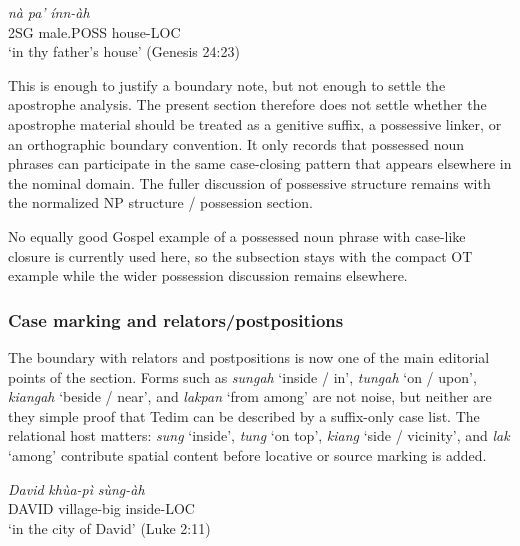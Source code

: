 \documentclass[
  11pt,
  a4paper,
]{article}
\newcommand{\tdim}[1]{\textit{#1}}
\newcommand{\tdimword}[1]{\textit{#1}}
\renewcommand{\textsc}[1]{{\footnotesize\MakeUppercase{#1}}}
\newcommand{\glossquote}[1]{`#1'}
\begin{document}
\begin{exe}
\ex \label{ex:case-poss-na-pa-inn}
\gll \tdimword{nà} \tdimword{pa'} \tdimword{ínn-àh} \\
     \textsc{2sg} male.\textsc{poss} house-\textsc{loc} \\
\glt \glossquote{in thy father's house} (Genesis 24:23)
\end{exe}

This is enough to justify a boundary note, but not enough to settle the
apostrophe analysis. The present section therefore does not settle
whether the apostrophe material should be treated as a genitive suffix,
a possessive linker, or an orthographic boundary convention. It only
records that possessed noun phrases can participate in the same
case-closing pattern that appears elsewhere in the nominal domain. The
fuller discussion of possessive structure remains with the normalized NP
structure / possession section.

No equally good Gospel example of a possessed noun phrase with case-like
closure is currently used here, so the subsection stays with the compact
OT example while the wider possession discussion remains elsewhere.

\subsubsection{Case marking and
relators/postpositions}\label{case-marking-and-relatorspostpositions}

The boundary with relators and postpositions is now one of the main
editorial points of the section. Forms such as \tdim{sungah}
\glossquote{inside / in}, \tdim{tungah} \glossquote{on / upon},
\tdim{kiangah} \glossquote{beside / near}, and \tdim{lakpan}
\glossquote{from among} are not noise, but neither are they simple proof
that Tedim can be described by a suffix-only case list. The relational
host matters: \tdim{sung} \glossquote{inside}, \tdim{tung}
\glossquote{on top}, \tdim{kiang} \glossquote{side / vicinity}, and
\tdim{lak} \glossquote{among} contribute spatial content before locative
or source marking is added.

\begin{exe}
\ex \label{ex:case-relator-david-khuapi-sungah}
\gll \tdimword{David} \tdimword{khùa-pì} \tdimword{sùng-àh} \\
     \textsc{david} village-big inside-\textsc{loc} \\
\glt \glossquote{in the city of David} (Luke 2:11)
\end{exe}
\end{document}
